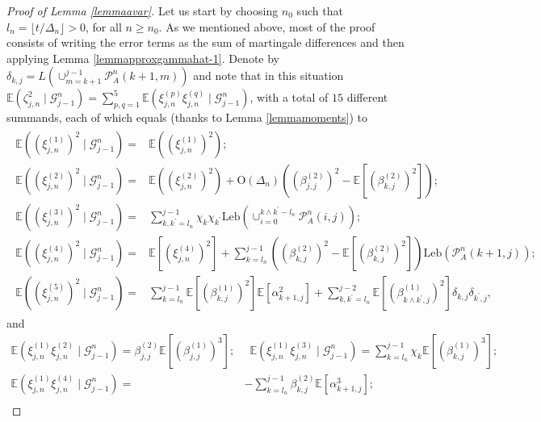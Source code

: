 \documentclass[10pt,a4paper]{amsart}
\newcommand{\Leb}{\ensuremath{\mathrm{Leb}}}
\begin{document}
\begin{proof}[Proof of Lemma \ref{lemmaavar}] Let us start by choosing $n_{0}$ such that $l_{n}=\lfloor t/\Delta_{n}\rfloor>0$, for all $n\geq n_{0}$. As we mentioned above, most of the proof consists of writing the error terms as the sum of martingale differences and then applying Lemma \ref{lemmapproxgammahat-1}.
	Denote by $\delta_{k,j}=L(\cup_{m=k+1}^{j-1}\mathcal{P}_{A}^{n}(k+1,m))$
	and note that in this situation $
\mathbb{E}(\zeta_{j,n}^{2}\mid\mathscr{G}_{j-1}^{n})=\sum_{p,q=1}^{5}\mathbb{E}(\xi_{j,n}^{(p)}\xi_{j,n}^{(q)}\mid\mathscr{G}_{j-1}^{n})$, with a total of $15$ different summands, each of which equals (thanks
	to Lemma \ref{lemmamoments}) to 
	\begin{align}
		\begin{aligned}\mathbb{E}((\xi_{j,n}^{(1)})^{2}\mid\mathscr{G}_{j-1}^{n})= & \mathbb{E}((\xi_{j,n}^{(1)})^{2});\\
			\mathbb{E}((\xi_{j,n}^{(2)})^{2}\mid\mathscr{G}_{j-1}^{n})= & \mathbb{E}((\xi_{j,n}^{(2)})^{2})+\mathrm{O}(\Delta_{n})\left((\beta_{j,j}^{(2)})^{2}-\mathbb{E}[(\beta_{k,j}^{(2)})^{2}]\right);\\
			\mathbb{E}((\xi_{j,n}^{(3)})^{2}\mid\mathscr{G}_{j-1}^{n})= & \sum_{k,k^{\prime}=l_{n}}^{j-1}\chi_{k}\chi_{k^{\prime}}\Leb(\cup_{i=0}^{k\land k^{\prime}-l_{n}}\mathcal{P}_{A}^{n}(i,j));\\
			\mathbb{E}((\xi_{j,n}^{(4)})^{2}\mid\mathscr{G}_{j-1}^{n})= & \mathbb{E}[(\xi_{j,n}^{(4)})^{2}]+\sum_{k=l_{n}}^{j-1}\left((\beta_{k,j}^{(2)})^{2}-\mathbb{E}[(\beta_{k,j}^{(2)})^{2}]\right)\Leb(\mathcal{P}_{A}^{n}(k+1,j));\\
			\mathbb{E}((\xi_{j,n}^{(5)})^{2}\mid\mathscr{G}_{j-1}^{n})= & \sum_{k=l_{n}}^{j-1}\mathbb{E}[(\beta_{k,j}^{(1)})^{2}]\mathbb{E}[\alpha_{k+1,j}^{2}]+\sum_{k,k^{\prime}=l_{n}}^{j-2}\mathbb{E}[(\beta_{k\land k^{\prime},j}^{(1)})^{2}]\delta_{k,j}\delta_{k^{\prime},j},
		\end{aligned}
		\label{eq:condvariances}
	\end{align} 
	and 
	\begin{equation}
		\begin{aligned}\mathbb{E}(\xi_{j,n}^{(1)}\xi_{j,n}^{(2)}\mid\mathscr{G}_{j-1}^{n})=\beta_{j,j}^{(2)}\mathbb{E}[(\beta_{j,j}^{(1)})^{3}]; & \,\,\,\mathbb{E}(\xi_{j,n}^{(1)}\xi_{j,n}^{(3)}\mid\mathscr{G}_{j-1}^{n})=\sum_{k=l_{n}}^{j-1}\chi_{k}\mathbb{E}[(\beta_{k,j}^{(1)})^{3}];\\
			\mathbb{E}(\xi_{j,n}^{(1)}\xi_{j,n}^{(4)}\mid\mathscr{G}_{j-1}^{n})= & -\sum_{k=l_{n}}^{j-1}\beta_{k,j}^{(2)}\mathbb{E}[\alpha_{k+1,j}^{3}];\\

\end{aligned}
\end{equation}
\end{proof}
\end{document}
